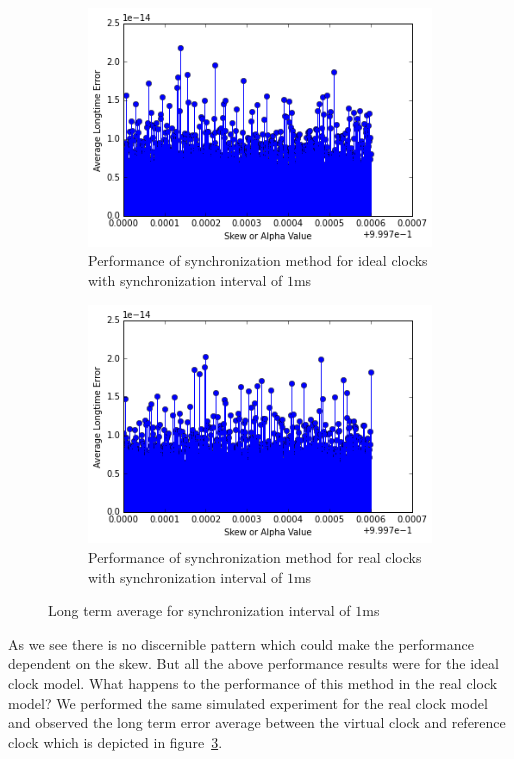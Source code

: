 \documentclass[10pt, journal, letter, onecolumn]{IEEEtran}
\begin{document}
\begin{figure}[h]
\begin{subfigure}[b]{0.48\textwidth}
\centering
\includegraphics[scale = 0.5]{figures/ideal_1ms}
\caption{Performance of synchronization method for ideal clocks with synchronization interval of $1$ms}
\label{fig:ideal_1ms}
\end{subfigure}
\begin{subfigure}[b]{0.48\textwidth}
\includegraphics[scale = 0.5]{figures/real_1ms}
\caption{Performance of synchronization method for real clocks with synchronization interval of $1$ms}
\label{fig:real_1ms}
\end{subfigure}
\caption{Long term average for synchronization interval of $1$ms}
\end{figure}

As we see there is no discernible pattern which could make the performance dependent on the skew. But all the above performance results were for the ideal clock model. What happens to the performance of this method in the real clock model? We performed the same simulated experiment for the real clock model and observed the long term error average between the virtual clock and reference clock which is depicted in figure~\ref{fig:real_1ms}.
\end{document}
